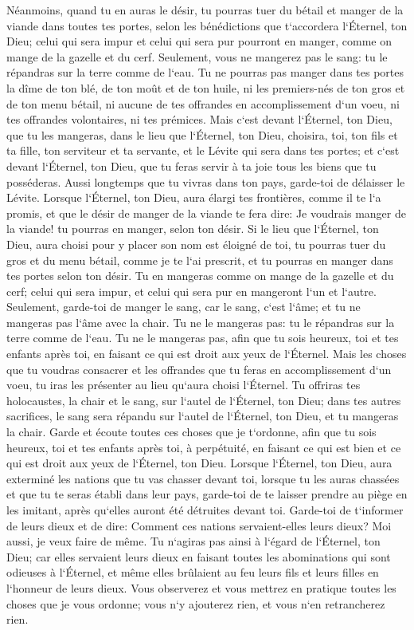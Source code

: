 \verse Néanmoins, quand tu en auras le désir, tu pourras tuer du bétail et manger de la viande dans toutes tes portes, selon les bénédictions que t`accordera l`Éternel, ton Dieu; celui qui sera impur et celui qui sera pur pourront en manger, comme on mange de la gazelle et du cerf. 
\verse Seulement, vous ne mangerez pas le sang: tu le répandras sur la terre comme de l`eau. 
\verse Tu ne pourras pas manger dans tes portes la dîme de ton blé, de ton moût et de ton huile, ni les premiers-nés de ton gros et de ton menu bétail, ni aucune de tes offrandes en accomplissement d`un voeu, ni tes offrandes volontaires, ni tes prémices. 
\verse Mais c`est devant l`Éternel, ton Dieu, que tu les mangeras, dans le lieu que l`Éternel, ton Dieu, choisira, toi, ton fils et ta fille, ton serviteur et ta servante, et le Lévite qui sera dans tes portes; et c`est devant l`Éternel, ton Dieu, que tu feras servir à ta joie tous les biens que tu posséderas. 
\verse Aussi longtemps que tu vivras dans ton pays, garde-toi de délaisser le Lévite. 
\verse Lorsque l`Éternel, ton Dieu, aura élargi tes frontières, comme il te l`a promis, et que le désir de manger de la viande te fera dire: Je voudrais manger de la viande! tu pourras en manger, selon ton désir. 
\verse Si le lieu que l`Éternel, ton Dieu, aura choisi pour y placer son nom est éloigné de toi, tu pourras tuer du gros et du menu bétail, comme je te l`ai prescrit, et tu pourras en manger dans tes portes selon ton désir. 
\verse Tu en mangeras comme on mange de la gazelle et du cerf; celui qui sera impur, et celui qui sera pur en mangeront l`un et l`autre. 
\verse Seulement, garde-toi de manger le sang, car le sang, c`est l`âme; et tu ne mangeras pas l`âme avec la chair. 
\verse Tu ne le mangeras pas: tu le répandras sur la terre comme de l`eau. 
\verse Tu ne le mangeras pas, afin que tu sois heureux, toi et tes enfants après toi, en faisant ce qui est droit aux yeux de l`Éternel. 
\verse Mais les choses que tu voudras consacrer et les offrandes que tu feras en accomplissement d`un voeu, tu iras les présenter au lieu qu`aura choisi l`Éternel. 
\verse Tu offriras tes holocaustes, la chair et le sang, sur l`autel de l`Éternel, ton Dieu; dans tes autres sacrifices, le sang sera répandu sur l`autel de l`Éternel, ton Dieu, et tu mangeras la chair. 
\verse Garde et écoute toutes ces choses que je t`ordonne, afin que tu sois heureux, toi et tes enfants après toi, à perpétuité, en faisant ce qui est bien et ce qui est droit aux yeux de l`Éternel, ton Dieu. 
\verse Lorsque l`Éternel, ton Dieu, aura exterminé les nations que tu vas chasser devant toi, lorsque tu les auras chassées et que tu te seras établi dans leur pays, 
\verse garde-toi de te laisser prendre au piège en les imitant, après qu`elles auront été détruites devant toi. Garde-toi de t`informer de leurs dieux et de dire: Comment ces nations servaient-elles leurs dieux? Moi aussi, je veux faire de même. 
\verse Tu n`agiras pas ainsi à l`égard de l`Éternel, ton Dieu; car elles servaient leurs dieux en faisant toutes les abominations qui sont odieuses à l`Éternel, et même elles brûlaient au feu leurs fils et leurs filles en l`honneur de leurs dieux. 
\verse Vous observerez et vous mettrez en pratique toutes les choses que je vous ordonne; vous n`y ajouterez rien, et vous n`en retrancherez rien. 

